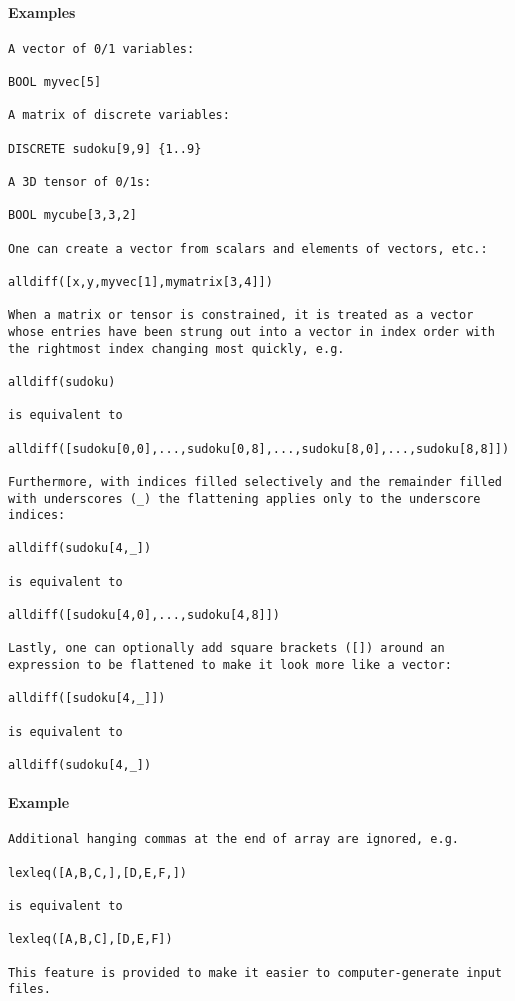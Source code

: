 \paragraph{Examples}
{\footnotesize
\begin{verbatim}
A vector of 0/1 variables:

BOOL myvec[5]

A matrix of discrete variables:

DISCRETE sudoku[9,9] {1..9}

A 3D tensor of 0/1s:

BOOL mycube[3,3,2]

One can create a vector from scalars and elements of vectors, etc.:

alldiff([x,y,myvec[1],mymatrix[3,4]])

When a matrix or tensor is constrained, it is treated as a vector
whose entries have been strung out into a vector in index order with
the rightmost index changing most quickly, e.g.

alldiff(sudoku)

is equivalent to

alldiff([sudoku[0,0],...,sudoku[0,8],...,sudoku[8,0],...,sudoku[8,8]])

Furthermore, with indices filled selectively and the remainder filled
with underscores (_) the flattening applies only to the underscore
indices:

alldiff(sudoku[4,_])

is equivalent to

alldiff([sudoku[4,0],...,sudoku[4,8]])

Lastly, one can optionally add square brackets ([]) around an
expression to be flattened to make it look more like a vector:

alldiff([sudoku[4,_]])

is equivalent to

alldiff(sudoku[4,_])
\end{verbatim}
}
\paragraph{Example}
{\footnotesize
\begin{verbatim}
Additional hanging commas at the end of array are ignored, e.g.

lexleq([A,B,C,],[D,E,F,])

is equivalent to

lexleq([A,B,C],[D,E,F])

This feature is provided to make it easier to computer-generate input
files.
\end{verbatim}
}
